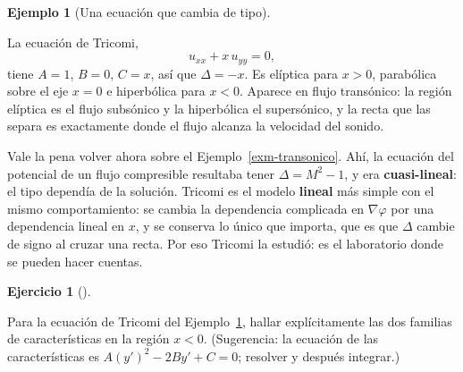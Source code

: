 \documentclass[
  spanish,
  a4paper,
]{scrbook}
\theoremstyle{definition}
\theoremstyle{plain}
\theoremstyle{definition}
\newtheorem{example}{Ejemplo}[chapter]
\theoremstyle{plain}
\theoremstyle{definition}
\newtheorem{exercise}{Ejercicio}[chapter]
\theoremstyle{remark}
\begin{document}
\begin{example}[Una ecuación que cambia de
tipo]\protect\hypertarget{exm-tricomi}{}\label{exm-tricomi}

La ecuación de Tricomi, \[
u_{xx} + x\,u_{yy} = 0,
\] tiene \(A = 1\), \(B = 0\), \(C = x\), así que \(\Delta = -x\). Es
elíptica para \(x>0\), parabólica sobre el eje \(x=0\) e hiperbólica
para \(x<0\). Aparece en flujo transónico: la región elíptica es el
flujo subsónico y la hiperbólica el supersónico, y la recta que las
separa es exactamente donde el flujo alcanza la velocidad del sonido.

Vale la pena volver ahora sobre el Ejemplo~\ref{exm-transonico}. Ahí, la
ecuación del potencial de un flujo compresible resultaba tener
\(\Delta = M^2-1\), y era \textbf{cuasi-lineal}: el tipo dependía de la
solución. Tricomi es el modelo \textbf{lineal} más simple con el mismo
comportamiento: se cambia la dependencia complicada en \(\nabla\varphi\)
por una dependencia lineal en \(x\), y se conserva lo único que importa,
que es que \(\Delta\) cambie de signo al cruzar una recta. Por eso
Tricomi la estudió: es el laboratorio donde se pueden hacer cuentas.

\end{example}

\begin{exercise}[]\protect\hypertarget{exr-tricomi}{}\label{exr-tricomi}

Para la ecuación de Tricomi del Ejemplo~\ref{exm-tricomi}, hallar
explícitamente las dos familias de características en la región \(x<0\).
(Sugerencia: la ecuación de las características es
\(A(y')^2 - 2By' + C = 0\); resolver y después integrar.)

\end{exercise}
\end{document}
